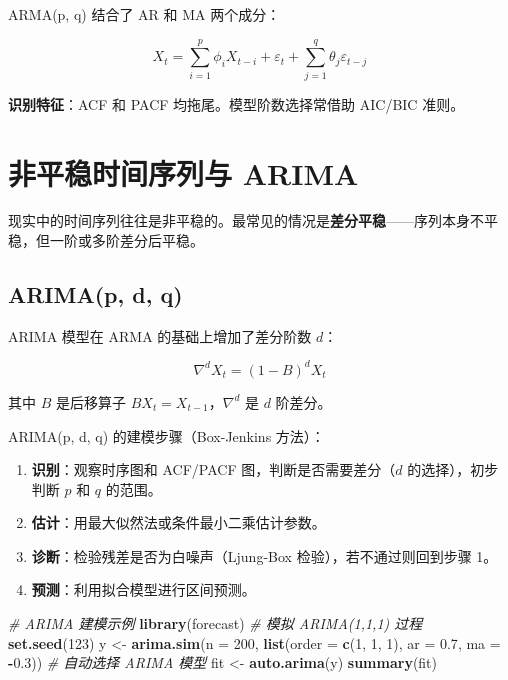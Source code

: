 \documentclass[
]{book}
\newenvironment{Shaded}{\begin{snugshade}}{\end{snugshade}}
\newcommand{\AttributeTok}[1]{\textcolor[rgb]{0.13,0.29,0.53}{#1}}
\newcommand{\CommentTok}[1]{\textcolor[rgb]{0.56,0.35,0.01}{\textit{#1}}}
\newcommand{\DecValTok}[1]{\textcolor[rgb]{0.00,0.00,0.81}{#1}}
\newcommand{\FloatTok}[1]{\textcolor[rgb]{0.00,0.00,0.81}{#1}}
\newcommand{\FunctionTok}[1]{\textcolor[rgb]{0.13,0.29,0.53}{\textbf{#1}}}
\newcommand{\NormalTok}[1]{#1}
\newcommand{\OtherTok}[1]{\textcolor[rgb]{0.56,0.35,0.01}{#1}}
\newcommand{\SpecialCharTok}[1]{\textcolor[rgb]{0.81,0.36,0.00}{\textbf{#1}}}
\providecommand{\tightlist}{%
  \setlength{\itemsep}{0pt}\setlength{\parskip}{0pt}}
\begin{document}
ARMA(p, q) 结合了 AR 和 MA 两个成分：

\[X_t = \sum_{i=1}^p \phi_i X_{t-i} + \varepsilon_t + \sum_{j=1}^q \theta_j \varepsilon_{t-j}\]

\textbf{识别特征}：ACF 和 PACF 均拖尾。模型阶数选择常借助 AIC/BIC 准则。

\section{非平稳时间序列与 ARIMA}\label{ux975eux5e73ux7a33ux65f6ux95f4ux5e8fux5217ux4e0e-arima}

现实中的时间序列往往是非平稳的。最常见的情况是\textbf{差分平稳}------序列本身不平稳，但一阶或多阶差分后平稳。

\subsection{ARIMA(p, d, q)}\label{arimap-d-q}

ARIMA 模型在 ARMA 的基础上增加了差分阶数 \(d\)：

\[\nabla^d X_t = (1 - B)^d X_t\]

其中 \(B\) 是后移算子 \(B X_t = X_{t-1}\)，\(\nabla^d\) 是 \(d\) 阶差分。

ARIMA(p, d, q) 的建模步骤（Box-Jenkins 方法）：

\begin{enumerate}
\def\labelenumi{\arabic{enumi}.}
\tightlist
\item
  \textbf{识别}：观察时序图和 ACF/PACF 图，判断是否需要差分（\(d\) 的选择），初步判断 \(p\) 和 \(q\) 的范围。
\item
  \textbf{估计}：用最大似然法或条件最小二乘估计参数。
\item
  \textbf{诊断}：检验残差是否为白噪声（Ljung-Box 检验），若不通过则回到步骤 1。
\item
  \textbf{预测}：利用拟合模型进行区间预测。
\end{enumerate}

\begin{Shaded}
\begin{Highlighting}[]
\CommentTok{\# ARIMA 建模示例}
\FunctionTok{library}\NormalTok{(forecast)}
\CommentTok{\# 模拟 ARIMA(1,1,1) 过程}
\FunctionTok{set.seed}\NormalTok{(}\DecValTok{123}\NormalTok{)}
\NormalTok{y }\OtherTok{\textless{}{-}} \FunctionTok{arima.sim}\NormalTok{(}\AttributeTok{n =} \DecValTok{200}\NormalTok{, }\FunctionTok{list}\NormalTok{(}\AttributeTok{order =} \FunctionTok{c}\NormalTok{(}\DecValTok{1}\NormalTok{, }\DecValTok{1}\NormalTok{, }\DecValTok{1}\NormalTok{), }\AttributeTok{ar =} \FloatTok{0.7}\NormalTok{, }\AttributeTok{ma =} \SpecialCharTok{{-}}\FloatTok{0.3}\NormalTok{))}
\CommentTok{\# 自动选择 ARIMA 模型}
\NormalTok{fit }\OtherTok{\textless{}{-}} \FunctionTok{auto.arima}\NormalTok{(y)}
\FunctionTok{summary}\NormalTok{(fit)}
\end{Highlighting}
\end{Shaded}
\end{document}
